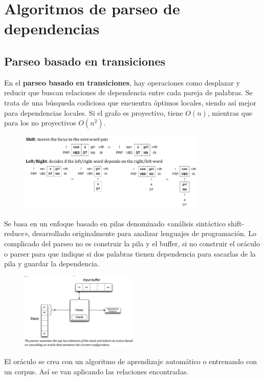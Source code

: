 \section{Algoritmos de parseo de dependencias}
\subsection{Parseo basado en transiciones}
En el \textbf{parseo basado en transiciones}, hay operaciones como desplazar y reducir que buscan relaciones de dependencia entre cada pareja de palabras. Se trata de una búsqueda codiciosa que encuentra óptimos locales, siendo así mejor para dependencias locales. Si el grafo es proyectivo, tiene $O(n)$, mientras que para los no proyectivos $O(n^2)$.

\begin{figure}[h]
\centering
\includegraphics[width = 0.8\textwidth]{figs/transition.png}
\end{figure}

Se basa en un enfoque basado en pilas denominado «análisis sintáctico shift-reduce», desarrollado originalmente para analizar lenguajes de programación. Lo complicado del parseo no es construir la pila y el buffer, si no construir el oráculo o parser para que indique si dos palabras tienen dependencia para sacarlas de la pila y guardar la dependencia. 

\begin{figure}[h]
\centering
\includegraphics[width = 0.5\textwidth]{figs/transition-parser.png}
\end{figure}

El oráculo se crea con un algoritmo de aprendizaje automático o entrenando con un corpus. Así se van aplicando las relaciones encontradas.

